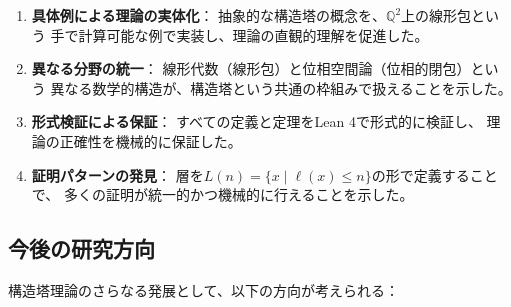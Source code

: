 \documentclass[a4paper,12pt]{ltjsarticle}
\theoremstyle{definition}
\begin{document}
\begin{enumerate}
\item \textbf{具体例による理論の実体化}：
  抽象的な構造塔の概念を、$\mathbb{Q}^2$上の線形包という
  手で計算可能な例で実装し、理論の直観的理解を促進した。

\item \textbf{異なる分野の統一}：
  線形代数（線形包）と位相空間論（位相的閉包）という
  異なる数学的構造が、構造塔という共通の枠組みで扱えることを示した。

\item \textbf{形式検証による保証}：
  すべての定義と定理をLean 4で形式的に検証し、
  理論の正確性を機械的に保証した。

\item \textbf{証明パターンの発見}：
  層を$L(n) = \{x \mid \ell(x) \leq n\}$の形で定義することで、
  多くの証明が統一的かつ機械的に行えることを示した。
\end{enumerate}

\subsection{今後の研究方向}

構造塔理論のさらなる発展として、以下の方向が考えられる：
\end{document}
